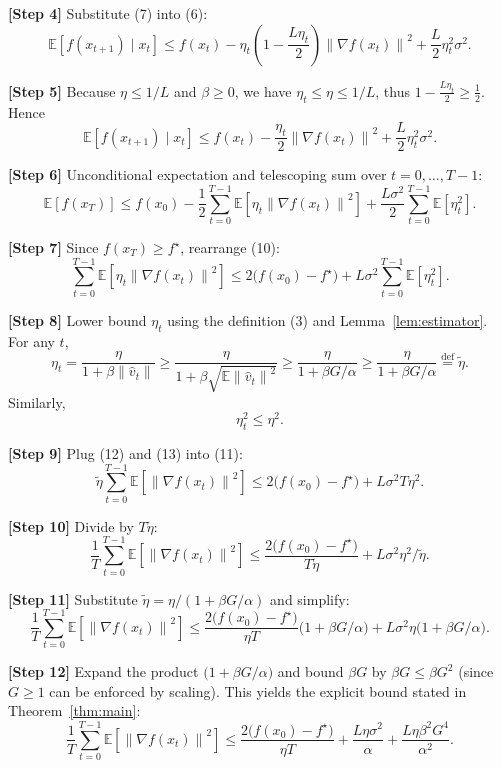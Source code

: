 \documentclass{article}
\newcommand{\E}{\mathbb{E}}
\newcommand{\norm}[1]{\left\lVert#1\right\rVert}
\begin{document}
\noindent\textbf{[Step 4]} Substitute (7) into (6):
\[
\E\!\left[f(x_{t+1})\mid x_t\right]
\le f(x_t)-\eta_t\!\left(1-\frac{L\eta_t}{2}\right)\norm{\nabla f(x_t)}^{2}
+\frac{L}{2}\eta_t^{2}\sigma^{2}.
\tag{8}
\]

\noindent\textbf{[Step 5]} Because $\eta\le 1/L$ and $\beta\ge0$, we have $\eta_t\le\eta\le 1/L$, thus $1-\frac{L\eta_t}{2}\ge \frac12$. Hence
\[
\E\!\left[f(x_{t+1})\mid x_t\right]
\le f(x_t)-\frac{\eta_t}{2}\norm{\nabla f(x_t)}^{2}
+\frac{L}{2}\eta_t^{2}\sigma^{2}.
\tag{9}
\]

\noindent\textbf{[Step 6]} Unconditional expectation and telescoping sum over $t=0,\dots,T-1$:
\[
\E[f(x_T)]\le f(x_0)-\frac12\sum_{t=0}^{T-1}\E\!\left[\eta_t\norm{\nabla f(x_t)}^{2}\right]
+\frac{L\sigma^{2}}{2}\sum_{t=0}^{T-1}\E[\eta_t^{2}].
\tag{10}
\]

\noindent\textbf{[Step 7]} Since $f(x_T)\ge f^\star$, rearrange (10):
\[
\sum_{t=0}^{T-1}\E\!\left[\eta_t\norm{\nabla f(x_t)}^{2}\right]
\le 2\bigl(f(x_0)-f^\star\bigr)
+L\sigma^{2}\sum_{t=0}^{T-1}\E[\eta_t^{2}].
\tag{11}
\]

\noindent\textbf{[Step 8]} Lower bound $\eta_t$ using the definition (3) and Lemma~\ref{lem:estimator}. For any $t$,
\[
\eta_t = \frac{\eta}{1+\beta\norm{\hat v_t}}
\ge \frac{\eta}{1+\beta\sqrt{\E\norm{\hat v_t}^{2}}}
\ge \frac{\eta}{1+\beta G/\alpha}
\ge \frac{\eta}{1+\beta G/\alpha}
\stackrel{\text{def}}{=}\tilde\eta .
\tag{12}
\]
Similarly,
\[
\eta_t^{2}\le \eta^{2}.
\tag{13}
\]

\noindent\textbf{[Step 9]} Plug (12) and (13) into (11):
\[
\tilde\eta\sum_{t=0}^{T-1}\E\!\left[\norm{\nabla f(x_t)}^{2}\right]
\le 2\bigl(f(x_0)-f^\star\bigr)+L\sigma^{2}T\eta^{2}.
\tag{14}
\]

\noindent\textbf{[Step 10]} Divide by $T\tilde\eta$:
\[
\frac{1}{T}\sum_{t=0}^{T-1}\E\!\left[\norm{\nabla f(x_t)}^{2}\right]
\le \frac{2\bigl(f(x_0)-f^\star\bigr)}{T\tilde\eta}
+L\sigma^{2}\eta^{2}/\tilde\eta .
\tag{15}
\]

\noindent\textbf{[Step 11]} Substitute $\tilde\eta = \eta/(1+\beta G/\alpha)$ and simplify:
\[
\frac{1}{T}\sum_{t=0}^{T-1}\E\!\left[\norm{\nabla f(x_t)}^{2}\right]
\le
\frac{2\bigl(f(x_0)-f^\star\bigr)}{\eta T}\bigl(1+\beta G/\alpha\bigr)
+L\sigma^{2}\eta\bigl(1+\beta G/\alpha\bigr).
\tag{16}
\]

\noindent\textbf{[Step 12]} Expand the product $\bigl(1+\beta G/\alpha\bigr)$ and bound $\beta G$ by $\beta G\le\beta G^{2}$ (since $G\ge1$ can be enforced by scaling). This yields the explicit bound stated in Theorem~\ref{thm:main}:
\[
\frac{1}{T}\sum_{t=0}^{T-1}\E\!\left[\norm{\nabla f(x_t)}^{2}\right]
\le
\frac{2\bigl(f(x_0)-f^\star\bigr)}{\eta T}
+\frac{L\eta\sigma^{2}}{\alpha}
+\frac{L\eta\beta^{2}G^{4}}{\alpha^{2}} .
\tag{17}
\]
\end{document}
